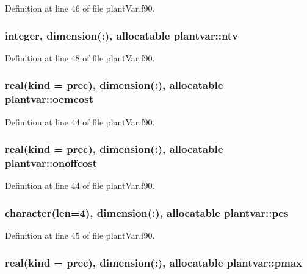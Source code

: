Definition at line 46 of file plant\-Var.\-f90.

\hypertarget{classplantvar_a019098844671b06b71ae0b76aa3d4fa8}{
\subsubsection[{ntv}]{\setlength{\rightskip}{0pt plus 5cm}integer, dimension(\-:), allocatable plantvar\-::ntv}}\label{classplantvar_a019098844671b06b71ae0b76aa3d4fa8}


Definition at line 48 of file plant\-Var.\-f90.

\hypertarget{classplantvar_a70a5a58ce085d08a2b8fb1434ab5862c}{
\subsubsection[{oemcost}]{\setlength{\rightskip}{0pt plus 5cm}real(kind = prec), dimension(\-:), allocatable plantvar\-::oemcost}}\label{classplantvar_a70a5a58ce085d08a2b8fb1434ab5862c}


Definition at line 44 of file plant\-Var.\-f90.

\hypertarget{classplantvar_a2e95a86439f2372f77360c8ba1efaaff}{
\subsubsection[{onoffcost}]{\setlength{\rightskip}{0pt plus 5cm}real(kind = prec), dimension(\-:), allocatable plantvar\-::onoffcost}}\label{classplantvar_a2e95a86439f2372f77360c8ba1efaaff}


Definition at line 44 of file plant\-Var.\-f90.

\hypertarget{classplantvar_a8b75644cc6f0b1728b0fdcd7c575c177}{
\subsubsection[{pes}]{\setlength{\rightskip}{0pt plus 5cm}character(len=4), dimension(\-:), allocatable plantvar\-::pes}}\label{classplantvar_a8b75644cc6f0b1728b0fdcd7c575c177}


Definition at line 45 of file plant\-Var.\-f90.

\hypertarget{classplantvar_aab06737bb534df1a69fff1f6f601a72a}{
\subsubsection[{pmax}]{\setlength{\rightskip}{0pt plus 5cm}real(kind = prec), dimension(\-:), allocatable plantvar\-::pmax}}\label{classplantvar_aab06737bb534df1a69fff1f6f601a72a}


